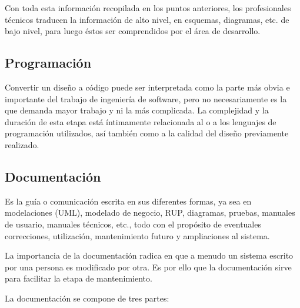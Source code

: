 \documentclass[12pt]{article}
\begin{document}
	\hspace{1.27cm}Con toda esta información recopilada en los puntos anteriores, los profesionales técnicos traducen la información de alto nivel, en esquemas, diagramas, etc. de bajo nivel, para luego éstos ser
	comprendidos por el área de desarrollo.

	\subsection*{Programación}

	\hspace{1.27cm}Convertir un diseño a código puede ser interpretada como la parte más obvia e importante del trabajo de ingeniería de software, pero no necesariamente es la que demanda mayor trabajo y ni la más complicada. La complejidad y la duración de esta etapa está íntimamente relacionada al o a los lenguajes de programación utilizados, así también como a la calidad del diseño previamente realizado.

	\subsection*{Documentación}

	\hspace{1.27cm}Es la guía o comunicación escrita en sus diferentes formas, ya sea en modelaciones (UML), modelado de negocio, RUP, diagramas, pruebas, manuales de usuario, manuales técnicos, etc., todo con el propósito de eventuales correcciones, utilización, mantenimiento futuro y ampliaciones al sistema.

	\hspace{1.27cm}La importancia de la documentación radica en que a menudo un sistema escrito por una persona es modificado por otra. Es por ello que la documentación sirve para facilitar la etapa de mantenimiento.

	\hspace{1.27cm}La documentación se compone de tres partes:
\end{document}

